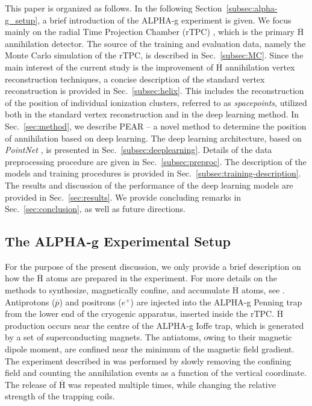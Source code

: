 \documentclass[a4paper,11pt]{article}
\begin{document}
This paper is organized as follows. In the following Section~\ref{subsec:alpha-g_setup}, a brief introduction of the ALPHA-g experiment is given. We focus mainly on the radial Time Projection Chamber (rTPC) \cite{capra2017design}, which is the primary $\overline{\mathrm{H}}$ annihilation detector. The source of the training and evaluation data, namely the Monte Carlo simulation of the rTPC, is described in Sec.~\ref{subsec:MC}. Since the main interest of the current study is the improvement of \textit{$\overline{\mathrm{H}}$} annihilation vertex reconstruction techniques, a concise description of the standard vertex reconstruction is provided in Sec.~\ref{subsec:helix}. This includes the reconstruction of the position of individual ionization clusters, referred to as \textit{spacepoints}, utilized both in the standard vertex reconstruction and in the deep learning method. In Sec.~\ref{sec:method}, we describe PEAR -- a novel method to determine the position of annihilation based on deep learning. The deep learning architecture, based on \textit{PointNet} \cite{Qi2017}, is presented in Sec.~\ref{subsec:deeplearning}. Details of the data preprocessing procedure are given in Sec.~\ref{subsec:preproc}. The description of the models and training procedures is provided in Sec.~\ref{subsec:training-description}. The results and discussion of the performance of the deep learning models are provided in Sec.~\ref{sec:results}. We provide concluding remarks in Sec.~\ref{sec:conclusion}, as well as future directions.

\subsection{The ALPHA-g Experimental Setup\label{subsec:alpha-g_setup}}
For the purpose of the present discussion, we only provide a brief description on how the $\overline{\mathrm{H}}$ atoms are prepared in the experiment. For more details on the methods to synthesize, magnetically confine, and accumulate $\overline{\mathrm{H}}$ atoms, see \cite{amole2014alpha, ahmadi2017antihydrogen}. Antiprotons ($\overline{p}$) and positrons ($e^+$) are injected into the ALPHA-g Penning trap from the lower end of the cryogenic apparatus, inserted inside the rTPC. $\overline{\mathrm{H}}$ production occurs near the centre of the ALPHA-g Ioffe trap, which is generated by a set of superconducting magnets. The antiatoms, owing to their magnetic dipole moment, are confined near the minimum of the magnetic field gradient.  The experiment described in \cite{anderson2023observation} was performed by slowly removing the confining field and counting the annihilation events as a function of the vertical coordinate. The release of $\overline{\mathrm{H}}$ was repeated multiple times, while changing the relative strength of the trapping coils. 
\end{document}
